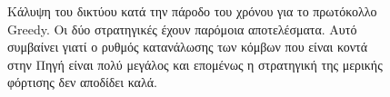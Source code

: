\begin{figure}[H]
  \centering
  \caption{Κάλυψη του δικτύου κατά την πάροδο του χρόνου για το πρωτόκολλο Greedy. Οι δύο στρατηγικές έχουν παρόμοια αποτελέσματα. Αυτό
συμβαίνει γιατί ο ρυθμός κατανάλωσης των κόμβων που είναι κοντά στην Πηγή είναι πολύ μεγάλος και επομένως η στρατηγική της μερικής φόρτισης δεν αποδίδει καλά.}
  \label{fig:2exp_3_1}
\end{figure}

